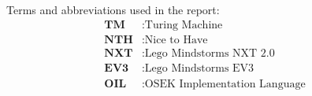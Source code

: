 
Terms and abbreviations used in the report:
\begin{align*}
	\textbf{TM} &: \text{Turing Machine} \\
    \textbf{NTH} &: \text{Nice to Have} \\
    \textbf{NXT} &: \text{Lego Mindstorms NXT 2.0} \\
    \textbf{EV3} &: \text{Lego Mindstorms EV3} \\  
    \textbf{OIL} &: \text{OSEK Implementation Language} \\  
\end{align*}